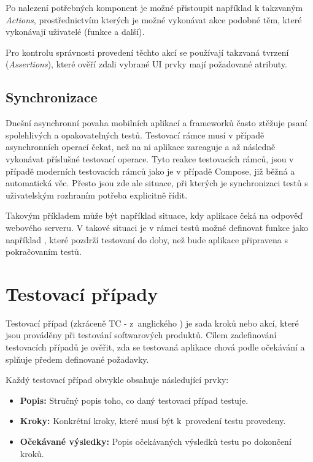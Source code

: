 Po nalezení potřebných komponent je možné přistoupit například k takzvaným \textit{Actions}, prostřednictvím kterých je možné vykonávat akce podobné
těm, které vykonávají uživatelé (funkce  a další).

Pro kontrolu správnosti provedení těchto akcí se používají takzvaná tvrzení (\textit{Assertions}), které ověří zdali vybrané UI prvky
mají požadované atributy. \cite{composeTesting}

\begin{sloppypar}
\subsection*{Synchronizace}
Dnešní asynchronní povaha mobilních aplikací a frameworků často ztěžuje psaní spolehlivých a opakovatelných testů. Testovací rámce
musí v případě asynchronních operací čekat, než na ni aplikace zareaguje a až následně vykonávat příslušné testovací operace. 
Tyto reakce testovacích rámců, jsou v případě moderních testovacích rámců jako je v případě Compose, již běžná a automatická věc. Přesto jsou zde ale
situace, při kterých je synchronizaci testů s uživatelským rozhraním potřeba explicitně řídit.

Takovým příkladem může být například situace, kdy aplikace čeká na odpověď webového serveru. V takové situaci je v rámci testů možné 
definovat funkce jako například , které pozdrží testovaní do doby, než bude aplikace
připravena s pokračovaním testů.
\end{sloppypar}


\section{Testovací případy}\label{testCases}
Testovací případ (zkráceně TC - z~anglického ) je sada kroků nebo akcí, které jsou prováděny při testování softwarových produktů. 
Cílem zadefinování testovacích případů je ověřit, zda se testovaná aplikace chová podle očekávání a splňuje předem definované požadavky. 

\bigskip

Každý testovací případ obvykle obsahuje následující prvky:

\begin{itemize}
  \item \textbf{Popis:} Stručný popis toho, co daný testovací případ testuje. %
  \item \textbf{Kroky:} Konkrétní kroky, které musí být k~provedení testu provedeny.
  \item \textbf{Očekávané výsledky:} Popis očekávaných výsledků testu po dokončení kroků.
\end{itemize}

